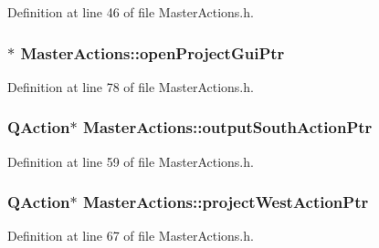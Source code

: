 Definition at line 46 of file Master\-Actions.\-h.

\hypertarget{class_master_actions_a6caf7325dd9cb26f72c81a8c877db634}{
\subsubsection[{open\-Project\-Gui\-Ptr}]{$\ast$ Master\-Actions\-::open\-Project\-Gui\-Ptr\hspace{0.3cm}{\ttfamily [private]}}}\label{class_master_actions_a6caf7325dd9cb26f72c81a8c877db634}


Definition at line 78 of file Master\-Actions.\-h.

\hypertarget{class_master_actions_a5b7a85c6728274eb0fcb48924044b9f6}{
\subsubsection[{output\-South\-Action\-Ptr}]{\setlength{\rightskip}{0pt plus 5cm}Q\-Action$\ast$ Master\-Actions\-::output\-South\-Action\-Ptr\hspace{0.3cm}{\ttfamily [private]}}}\label{class_master_actions_a5b7a85c6728274eb0fcb48924044b9f6}


Definition at line 59 of file Master\-Actions.\-h.

\hypertarget{class_master_actions_aa4160469d2e9a840448c49e95bcfa9e5}{
\subsubsection[{project\-West\-Action\-Ptr}]{\setlength{\rightskip}{0pt plus 5cm}Q\-Action$\ast$ Master\-Actions\-::project\-West\-Action\-Ptr\hspace{0.3cm}{\ttfamily [private]}}}\label{class_master_actions_aa4160469d2e9a840448c49e95bcfa9e5}


Definition at line 67 of file Master\-Actions.\-h.

